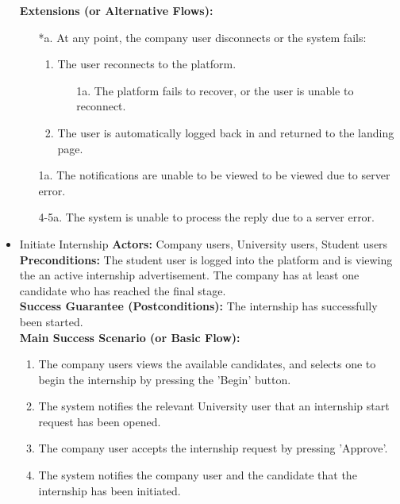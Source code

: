 \begin{itemize}[label={[\textbf{UC}]}, align=left, leftmargin=*]
    \textbf{Extensions (or Alternative Flows):} 
    \begin{enumerate}[label=\arabic*.]
        \item[*a.] At any point, the company user disconnects or the system fails:
            \begin{enumerate}[label=\arabic*.]
                \item The user reconnects to the platform.
                    \begin{enumerate}[label=\alph*.]
                        \item[1a.] The platform fails to recover, or the user is unable to reconnect.
                    \end{enumerate}
                 \item The user is automatically logged back in and returned to the landing page.
            \end{enumerate}
        \item[1a.] The notifications are unable to be viewed to be viewed due to server error.
        \item[4-5a.] The system is unable to process the reply due to a server error. 
        \end{enumerate}


        
    \item {} Initiate Internship
    \textbf{Actors:} Company users, University users, Student users\\
     \textbf{Preconditions:} The student user is logged into the platform and is viewing the an active internship advertisement. The company has at least one candidate who has reached the final stage.\\
     \textbf{Success Guarantee (Postconditions):} The internship has successfully been started. \\
     \textbf{Main Success Scenario (or Basic Flow):} 
     \begin{enumerate}[label=\arabic*.] 
        \item The company users views the available candidates, and selects one to begin the internship by pressing the 'Begin' button.
        \item The system notifies the relevant University user that an internship start request has been opened.
        \item The company user accepts the internship request by pressing 'Approve'.
        \item The system notifies the company user and the candidate that the internship has been initiated.
     \end{enumerate} \\


\end{itemize}
